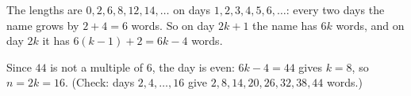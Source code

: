 The lengths are $0,2,6,8,12,14,\dots$ on days $1,2,3,4,5,6,\dots$: every two days the name grows by $2+4=6$ words. So on day $2k+1$ the name has $6k$ words, and on day $2k$ it has $6(k-1)+2=6k-4$ words.

Since $44$ is not a multiple of $6$, the day is even: $6k-4=44$ gives $k=8$, so $n=2k=\boxed{16}$. (Check: days $2,4,\dots,16$ give $2,8,14,20,26,32,38,44$ words.)
